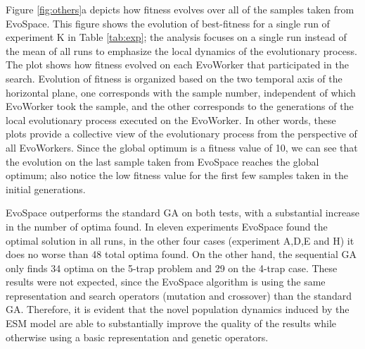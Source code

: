 Figure \ref{fig:others}a depicts how fitness evolves over all of the samples taken from EvoSpace.
This figure shows the evolution of best-fitness for a single run of experiment K in Table \ref{tab:exp};
the analysis focuses on a single run instead of the mean of all runs to emphasize the local dynamics of the evolutionary process.
The plot shows how fitness evolved on each EvoWorker that participated in the search.
Evolution of fitness is organized based on the two temporal axis of the horizontal plane,
one corresponds with the sample number, independent of which EvoWorker took the sample, and the other corresponds
to the generations of the local evolutionary process executed on the EvoWorker.
In other words, these plots provide a collective view of the evolutionary process from the perspective of all EvoWorkers.
Since the global optimum is a fitness value of 10, we can see that the evolution on the last sample taken from EvoSpace reaches the global optimum;
also notice the low fitness value for the first few samples taken in the initial generations.

EvoSpace outperforms the standard GA on both tests, with a substantial increase in the number of optima found.
In eleven experiments EvoSpace found the optimal solution in all runs, in the other four cases (experiment A,D,E and H) it does no worse than
48 total optima found.
On the other hand, the sequential GA only finds 34 optima on the 5-trap problem and 29 on the 4-trap case.
These results were not expected, since the EvoSpace algorithm is using the same representation and search operators (mutation and crossover) than the standard
GA. Therefore, it is evident that the novel population dynamics induced by the ESM model are able to substantially improve the quality of the results
while otherwise using a basic representation and genetic operators.

